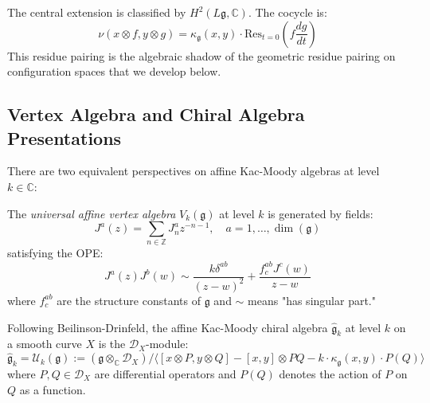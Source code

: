 \begin{remark}
The central extension is classified by $H^2(L\mathfrak{g}, \mathbb{C})$. The cocycle is:
\begin{equation}
\nu(x \otimes f, y \otimes g) = \kappa_{\mathfrak{g}}(x,y) \cdot \mathrm{Res}_{t=0}\left(f \frac{dg}{dt}\right)
\end{equation}
This residue pairing is the algebraic shadow of the geometric residue pairing on configuration spaces that we develop below.
\end{remark}

\subsection{Vertex Algebra and Chiral Algebra Presentations}

There are two equivalent perspectives on affine Kac-Moody algebras at level $k \in \mathbb{C}$:

\begin{definition}
The \emph{universal affine vertex algebra} $V_k(\mathfrak{g})$ at level $k$ is generated by fields:
\begin{equation}
J^a(z) = \sum_{n \in \mathbb{Z}} J^a_n z^{-n-1}, \quad a = 1,\ldots,\dim(\mathfrak{g})
\end{equation}
satisfying the OPE:
\begin{equation}\label{eq:affine-kac-moody-ope}
J^a(z) J^b(w) \sim \frac{k \delta^{ab}}{(z-w)^2} + \frac{f^{ab}_c J^c(w)}{z-w}
\end{equation}
where $f^{ab}_c$ are the structure constants of $\mathfrak{g}$ and $\sim$ means "has singular part."
\end{definition}

\begin{definition}\label{def:chiral-kac-moody}
Following Beilinson-Drinfeld, the affine Kac-Moody chiral algebra $\widehat{\mathfrak{g}}_k$ at level $k$ on a smooth curve $X$ is the $\mathcal{D}_X$-module:
\begin{equation}
\widehat{\mathfrak{g}}_k = \mathcal{U}_k(\mathfrak{g}) := \left(\mathfrak{g} \otimes_{\mathbb{C}} \mathcal{D}_X\right) / \langle [x \otimes P, y \otimes Q] - [x,y] \otimes PQ - k \cdot \kappa_{\mathfrak{g}}(x,y) \cdot P(Q) \rangle
\end{equation}
where $P, Q \in \mathcal{D}_X$ are differential operators and $P(Q)$ denotes the action of $P$ on $Q$ as a function.
\end{definition}

